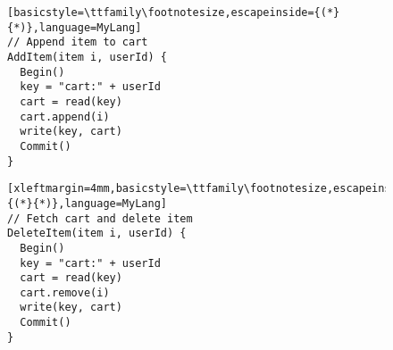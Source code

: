 \begin{figure}
	\begin{minipage}{4.2cm}
		\begin{lstlisting}[basicstyle=\ttfamily\footnotesize,escapeinside={(*}{*)},language=MyLang]
// Append item to cart
AddItem(item i, userId) {
  Begin()
  key = "cart:" + userId
  cart = read(key)
  cart.append(i)
  write(key, cart)
  Commit()
}
		\end{lstlisting}
	\end{minipage}
	\hspace{-5mm}
	\begin{minipage}{4.2cm}
		\begin{lstlisting}[xleftmargin=4mm,basicstyle=\ttfamily\footnotesize,escapeinside={(*}{*)},language=MyLang]
// Fetch cart and delete item
DeleteItem(item i, userId) {
  Begin()
  key = "cart:" + userId
  cart = read(key)
  cart.remove(i)
  write(key, cart)
  Commit()
}
		\end{lstlisting}
	\end{minipage}
	

\end{figure}
